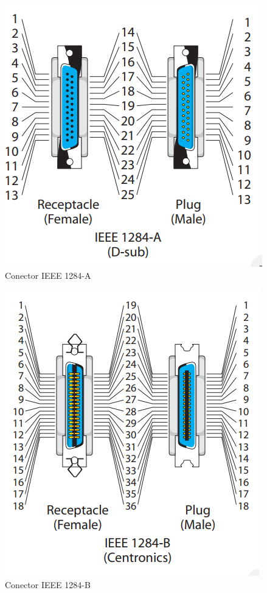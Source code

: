 \documentclass[a4paper,12pt]{article}
\begin{document}
\begin{enumerate}
 
 \begin{figure}
   \centering
   \includegraphics[scale = 0.4]{3.png}
   \caption{Conector IEEE 1284-A \cite{IEEEparallel}}
   \label{fig:IEEE1}
  \end{figure}
  
  \begin{figure}
   \centering
   \includegraphics[scale = 0.4]{4.png}
   \caption{Conector IEEE 1284-B \cite{IEEEparallel}}
   \label{fig:IEEE2}
  \end{figure}
  

\end{enumerate}
\end{document}
